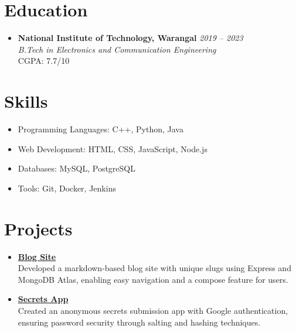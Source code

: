 \documentclass[a4paper,10pt]{article} %
\begin{document}
\vspace{0.001em} %
\section*{Education}
\begin{itemize}[leftmargin=0.3in, itemsep=3pt, topsep=2pt]
    \item
    \textbf{National Institute of Technology, Warangal} \hfill \textit{2019 – 2023} \\
    \textit{B.Tech in Electronics and Communication Engineering} \\
    CGPA: 7.7/10
\end{itemize}
\vspace{0.001em} %
\section*{Skills}
\begin{multicols}{2}  %
    \begin{itemize}[leftmargin=0.3in, itemsep=0.7pt, topsep=2pt]
        \item Programming Languages: C++, Python, Java
        \item Web Development: HTML, CSS, JavaScript, Node.js
    \end{itemize}
    \begin{itemize}[leftmargin=0.3in, itemsep=0.7pt, topsep=2pt]
        \item Databases: MySQL, PostgreSQL
        \item Tools: Git, Docker, Jenkins
    \end{itemize}
\end{multicols}
\vspace{0.001em} %
\section*{Projects}
\begin{itemize}[leftmargin=0.3in, itemsep=3pt, topsep=0pt] %
    \item \textbf{\href{https://blog-markdown-node.herokuapp.com/}{Blog Site}} \\
    Developed a markdown-based blog site with unique slugs using Express and MongoDB Atlas, enabling easy navigation and a compose feature for users.
    
    \item \textbf{\href{https://github.com/nikhilsh2003/Secrets-App}{Secrets App}} \\
    Created an anonymous secrets submission app with Google authentication, ensuring password security through salting and hashing techniques.
\end{itemize}
\vspace{0.001em} %
\end{document}
